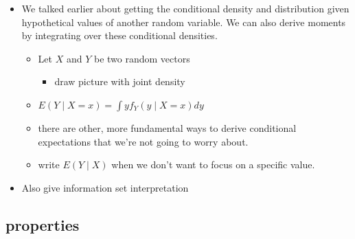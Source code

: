 \begin{itemize}
\item We talked earlier about getting the conditional density and
      distribution given hypothetical values of another random variable.
      We can also derive moments by integrating over these conditional
      densities.
\begin{itemize}
\item Let $X$ and $Y$ be two random vectors
\begin{itemize}
\item draw picture with joint density
\end{itemize}
\item $E(Y \mid X = x) = \int y f_Y(y \mid X = x) dy$
\item there are other, more fundamental ways to derive conditional
         expectations that we're not going to worry about.
\item write $E(Y \mid X)$ when we don't want to focus on a specific
         value.
\end{itemize}
\item Also give information set interpretation
\end{itemize}

\subsection{properties}

